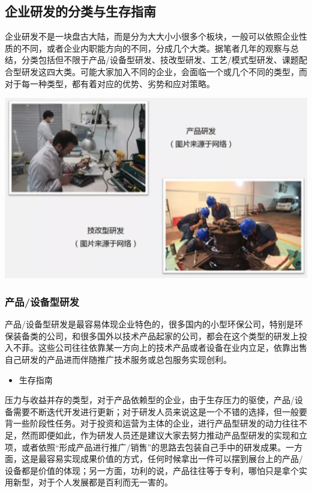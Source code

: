 \documentclass[
]{book}
\providecommand{\tightlist}{%
  \setlength{\itemsep}{0pt}\setlength{\parskip}{0pt}}
\begin{document}
\hypertarget{ux4f01ux4e1aux7814ux53d1ux7684ux5206ux7c7bux4e0eux751fux5b58ux6307ux5357}{%
\subsection{企业研发的分类与生存指南}\label{ux4f01ux4e1aux7814ux53d1ux7684ux5206ux7c7bux4e0eux751fux5b58ux6307ux5357}}

企业研发不是一块盘古大陆，而是分为大大小小很多个板块，一般可以依照企业性质的不同，或者企业内职能方向的不同，分成几个大类。据笔者几年的观察与总结，分类包括但不限于产品/设备型研发、技改型研发、工艺/模式型研发、课题配合型研发这四大类。可能大家加入不同的企业，会面临一个或几个不同的类型，而对于每一种类型，都有着对应的优势、劣势和应对策略。

\includegraphics[width=6.67in]{images/qiye5}

\hypertarget{ux4ea7ux54c1ux8bbeux5907ux578bux7814ux53d1}{%
\subsubsection{产品/设备型研发}\label{ux4ea7ux54c1ux8bbeux5907ux578bux7814ux53d1}}

产品/设备型研发是最容易体现企业特色的，很多国内的小型环保公司，特别是环保装备类的公司，和很多国外以技术产品起家的公司，都会在这个类型的研发上投入不菲。这些公司往往依靠某一方向上的技术产品或者设备在业内立足，依靠出售自己研发的产品进而伴随推广技术服务或总包服务实现创利。

\begin{itemize}
\tightlist
\item
  生存指南
\end{itemize}

压力与收益并存的类型，对于产品依赖型的企业，由于生存压力的驱使，产品/设备需要不断迭代开发进行更新；对于研发人员来说这是一个不错的选择，但一般要背一些阶段性任务。对于投资和运营为主体的企业，进行产品型研发的动力往往不足，然而即便如此，作为研发人员还是建议大家去努力推动产品型研发的实现和立项，或者依照``形成产品进行推广/销售''的思路去包装自己手中的研发成果。一方面，这是最容易实现成果价值的方式，任何时候拿出一件可以摆到展台上的产品/设备都是价值的体现；另一方面，功利的说，产品往往等于专利，哪怕只是拿个实用新型，对于个人发展都是百利而无一害的。
\end{document}
